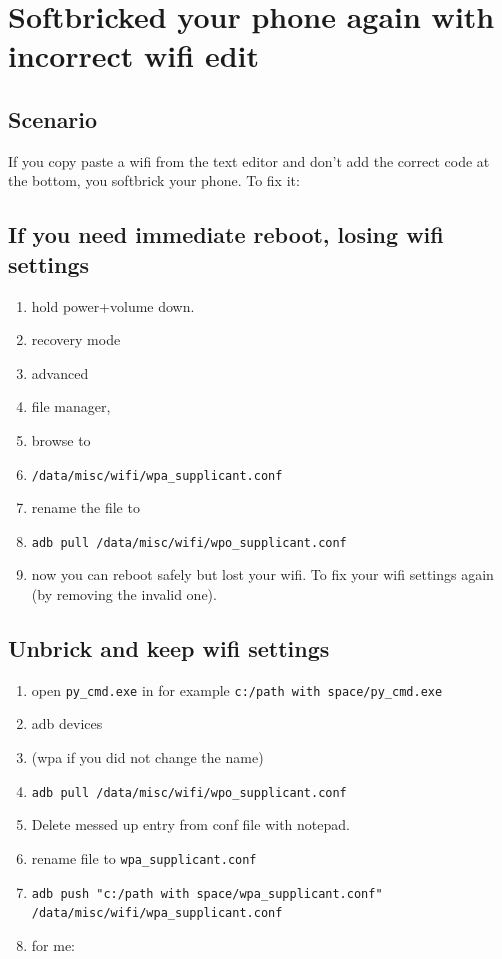 \section{Softbricked your phone again with incorrect wifi edit}
\subsection{Scenario}
If you copy paste a wifi from the text editor and don't add the correct code at the bottom, you softbrick your phone. To fix it:

\subsection{If you need immediate reboot, losing wifi settings}
\begin{enumerate}
    \item hold power+volume down.
     \item recovery mode
    \item advanced
    \item file manager,
    \item browse to
    \item \verb+/data/misc/wifi/wpa_supplicant.conf+
    \item rename the file to
    \item \verb+adb pull /data/misc/wifi/wpo_supplicant.conf+
    
    \item now you can reboot safely but lost your wifi. To fix your wifi settings again (by removing the invalid one).
\end{enumerate}


\subsection{Unbrick and keep wifi settings}
\begin{enumerate}
    \item open \verb+py_cmd.exe+ in for example \verb+c:/path with space/py_cmd.exe+
    \item adb devices
    \item (wpa if you did not change the name)
    \item \verb+adb pull /data/misc/wifi/wpo_supplicant.conf+
    \item Delete messed up entry from conf file with notepad.
    \item rename file to \verb+wpa_supplicant.conf+
    \item \verb+adb push "c:/path with space/wpa_supplicant.conf" /data/misc/wifi/wpa_supplicant.conf+

    \item for me: 

\end{enumerate}

